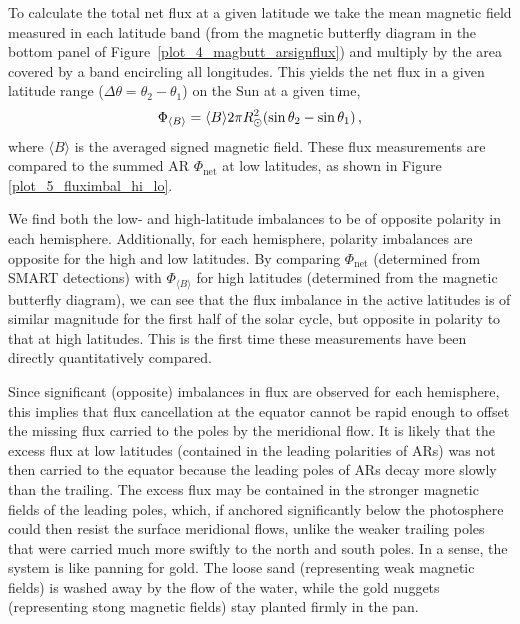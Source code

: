 To calculate the total net flux at a given latitude we take the mean magnetic field measured in each latitude band (from the magnetic butterfly diagram in the bottom panel of Figure~\ref{plot_4_magbutt_arsignflux}) and multiply by the area covered by a band encircling all longitudes. This yields the net flux in a given latitude range ($\Delta \theta=\theta_2-\theta_1$) on the Sun at a given time,
\begin{equation}
\Phi_{\langle B \rangle}=\langle B \rangle 2\pi R_{\odot}^2 (\sin\theta_2 - \sin\theta_1 ) \mbox{\,,}
\end{equation}
where $\langle B \rangle$ is the averaged signed magnetic field. These flux measurements are compared to the summed \gls{AR} $\Phi_{\mathrm{net}}$ at low latitudes, as shown in Figure\,\ref{plot_5_fluximbal_hi_lo}.

We find both the low- and high-latitude imbalances to be of opposite polarity in each hemisphere. Additionally, for each hemisphere, polarity imbalances are opposite for the high and low latitudes. By comparing $\Phi_{\mathrm{net}}$ (determined from \gls{SMART} detections) 
with $\Phi_{\langle B \rangle}$ for high latitudes (determined from the magnetic butterfly diagram), we can see that the flux imbalance in the active latitudes is of similar magnitude for the first half of the solar cycle, but opposite in polarity to that at high latitudes. This is the first time these measurements have been directly quantitatively compared. 

Since significant (opposite) imbalances in flux are observed for each hemisphere, this implies that flux cancellation at the equator cannot be rapid enough to offset the missing flux carried to the poles by the meridional flow. It is likely that the excess flux at low latitudes (contained in the leading polarities of \glspl{AR}) was not then carried to the equator because the leading poles of \glspl{AR} decay more slowly than the trailing. The excess flux may be contained in the stronger magnetic fields of the leading poles, which, if anchored significantly below the photosphere could then resist the surface meridional flows, unlike the weaker trailing poles that were carried much more swiftly to the north and south poles. In a sense, the system is like panning for gold. The loose sand (representing weak magnetic fields) is washed away by the flow of the water, while the gold nuggets (representing stong magnetic fields) stay planted firmly in the pan.

